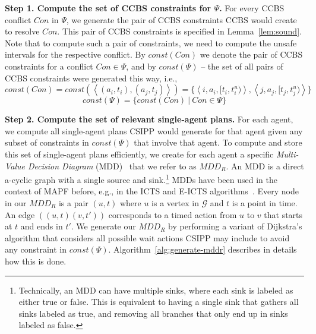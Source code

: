 \documentclass[review]{elsarticle}
\newcommand{\tuple}[1]{\ensuremath{\left \langle #1 \right \rangle }}
\newcommand{\mddr}{\ensuremath{MDD_R}\xspace}
\newcommand\konstantin[1]{\nb{\textbf{Konstantin:}}{red}{#1}}
\newcommand{\ccbs}{\ac{CCBS}\xspace}
\newcommand{\csipp}{\ac{CSIPP}\xspace}
\newcommand{\mapf}{\ac{MAPF}\xspace}
\newcommand{\const}{\textit{const}\xspace}
\begin{document}
\textbf{Step 1. Compute the set of \ccbs constraints for $\Psi$.}
For every \ccbs conflict $Con$ in $\Psi$, we generate the pair of \ccbs constraints \ccbs would create to resolve $Con$. 
This pair of \ccbs constraints is specified in Lemma~\ref{lem:sound}. 
Note that to compute such a pair of constraints, we need to compute the unsafe intervals for the respective conflict. 
By $\const(Con)$ we denote the pair of \ccbs constraints for a conflict $Con\in \Psi$, 
and by $\const(\Psi)$ -- the set of all pairs of \ccbs constraints were generated this way, i.e., 
\begin{equation}
\const(Con) = \const(\tuple{ (a_i, t_i), (a_j,t_j) }) = \{ \tuple{i, a_i, [t_i, t_i^u)}, \tuple{j, a_j, [t_j, t_j^u)} \}
\end{equation}
\begin{equation}
\const(\Psi) = \{ \const(Con)~|~Con\in \Psi\} 
\end{equation}



\textbf{Step 2. Compute the set of relevant single-agent plans.}
For each agent, we compute all single-agent plans \csipp would generate for that agent given any subset of constraints in $\const(\Psi)$ that involve that agent. 
To compute and store this set of single-agent plans efficiently, we create for each agent a 
specific \emph{Multi-Value Decision Diagram} (MDD)~\cite{srinivasan1990algorithms} that we refer to as \mddr. 
An MDD is a direct a-cyclic graph with a single source and sink.\footnote{Technically, an MDD can have multiple sinks, where each sink is labeled as either true or false. This is equivalent to having a single sink that gathers all sinks labeled as true, and removing all branches that only end up in sinks labeled as false.}
MDDs have been used in the context of \mapf before, e.g., in the ICTS and E-ICTS algorithms~\cite{sharon2013increasing,walker2018extended}. 
Every node in our \mddr is a pair $(u,t)$ where $u$ is a vertex in $\mathcal{G}$ 
and $t$ is a point in time. 
An edge $((u,t)(v,t'))$ corresponds to a timed action from $u$ to $v$ that starts at $t$ and ends in $t'$. We generate our \mddr by performing a variant of Dijkstra's algorithm that considers all possible wait actions \csipp may include to avoid any constraint in $\const(\Psi)$. 
Algorithm~\ref{alg:generate-mddr} describes in details how this is done. 
\end{document}
